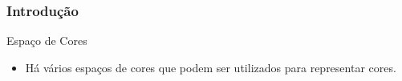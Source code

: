 \documentclass{beamer}
\begin{document}
\begin{frame}
\frametitle{Introdução}

		\begin{block}{Espaço de Cores}
			\begin{itemize}
				\item Há vários espaços de cores que podem ser utilizados para representar cores.
			\end{itemize} 
		\end{block}
		
		\begin{figure}[htb!]
  		\centering
   			\qquad
     		\qquad
     		\qquad
  		\label{iep}
	\end{figure}
	
\end{frame}
\end{document}
